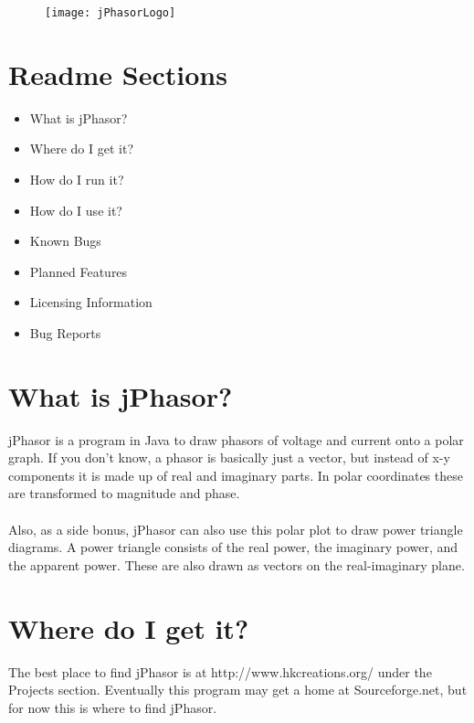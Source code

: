 \documentclass[10pt]{article}
\begin{document}

\begin{figure}[H]
	\begin{center}
	\texttt{[image: jPhasorLogo]}
	\end{center}
\end{figure}

\section*{Readme Sections}
\begin{itemize}
	\item What is jPhasor?
	\item Where do I get it?
	\item How do I run it?
	\item How do I use it?
	\item Known Bugs
	\item Planned Features
	\item Licensing Information
	\item Bug Reports
\end{itemize}

\section*{What is jPhasor?}
jPhasor is a program in Java to draw phasors of voltage and current onto a polar graph. 
If you don't know, a phasor is basically just a vector, but instead of x-y components it is 
made up of real and imaginary parts. In polar coordinates these are transformed to magnitude and phase.
\\ \\
Also, as a side bonus, jPhasor can also use this polar plot to draw power triangle diagrams. 
A power triangle consists of the real power, the imaginary power, and the apparent power. 
These are also drawn as vectors on the real-imaginary plane.

\section*{Where do I get it?}
The best place to find jPhasor is at http://www.hkcreations.org/ under the Projects section.
Eventually this program may get a home at Sourceforge.net, but for now this is where to find
jPhasor.
\end{document}
